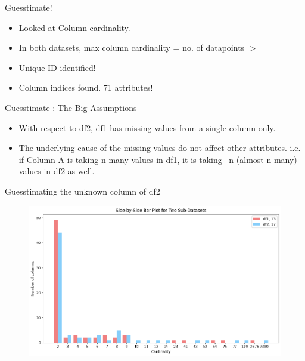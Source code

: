 \documentclass{beamer}
\begin{document}
\begin{frame}{Guesstimate!}
\begin{itemize}
    \item Looked at Column cardinality.
    \item In both datasets, max column cardinality = no. of datapoints $>$
    \item Unique ID identified! 
    \item Column indices found. 71 attributes!
\end{itemize}
\end{frame}
\begin{frame}{Guesstimate : The Big Assumptions}
\begin{itemize}
    \item  With respect to df2, df1 has missing values from a single column only.
    \item The underlying cause of the missing values do not affect other attributes. i.e. if Column A is taking n many values in df1, it is taking ~n (almost n many) values in df2 as well.
\end{itemize}
\end{frame}

\begin{frame}{Guesstimating the unknown column of df2}
\begin{figure}
    \centering
    \includegraphics[width=1.0\textwidth]{slide_image/bar_col.png}
\end{figure}
\end{frame}
\end{document}
